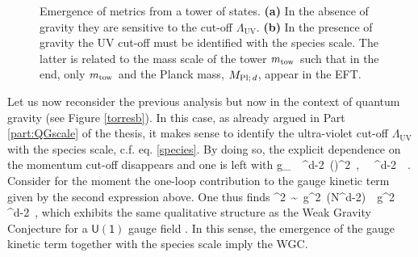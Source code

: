 %
\begin{figure}[t]
		\begin{center}
			\caption{Emergence of metrics from a tower of states. \textbf{(a)} In the absence of gravity they are sensitive to the cut-off $\Lambda_{\text{UV}}$. \textbf{(b)} In the presence of gravity the UV cut-off must be identified with the species scale. The latter is related to the mass scale of the tower $m_{\text{tow}}$ such that in the end, only $m_{\text{tow}}$ and the Planck mass, $M_{\text{Pl;}\, d}$, appear in the EFT.}			
		\label{torres}
		\end{center}
\end{figure} 
%	
Let us now reconsider the previous analysis but now in the context of quantum gravity (see Figure \ref{torresb}). In this case, as already argued in Part \ref{part:QGscale} of the thesis, it makes sense to identify the ultra-violet cut-off $\Lambda_{\text{UV}}$ with the species scale, c.f. eq. \eqref{species}. By doing so, the explicit dependence on the momentum cut-off disappears and one is left with %
%
\beq\label{eq:emergencegeneralQG}
	g_{\phi\phi}\, \lesssim\,  \Mpd^{d-2}\, \left(\frac {\partial_\phi \Mt}{\Mt}\right)^2\, , \qquad {}\, \lesssim\, \Mpd^{d-2}\, \, .
\eeq
%
Consider for the moment the one-loop contribution to the gauge kinetic term given by the second expression above. One thus finds
%
\beq
	\Mt^2\, \sim\, g^2\, \left(N\LSP^{d-2}\right)\, \lesssim\, g^2 \Mpd^{d-2}\, ,
\eeq
%
which exhibits the same qualitative structure as the Weak Gravity Conjecture for a $\mathsf{U(1)}$ gauge field \cite{Arkani-Hamed:2006emk}. In this sense, the emergence of the gauge kinetic term together with the species scale imply the WGC.

